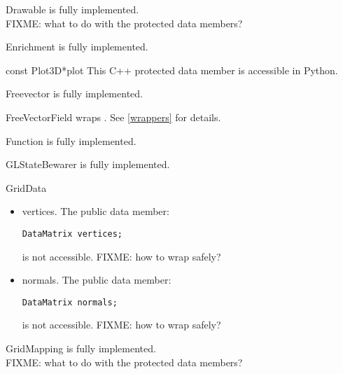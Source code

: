 \documentclass{manual}
\begin{document}
\begin{classdesc*}{Drawable}
  is fully implemented.\\
  FIXME: what to do with the protected data members?
\end{classdesc*}

\begin{classdesc*}{Enrichment}
  is fully implemented.\\
  \begin{cvardesc}{const Plot3D*}{plot}
    This C++ protected data member is accessible in Python.
  \end{cvardesc}
\end{classdesc*}

\begin{classdesc*}{Freevector}
  is fully implemented.
\end{classdesc*}

\begin{classdesc*}{FreeVectorField}
  wraps . See \ref{wrappers} for details.
\end{classdesc*}

\begin{classdesc*}{Function}
  is fully implemented.
\end{classdesc*}

\begin{classdesc*}{GLStateBewarer}
  is fully implemented.
\end{classdesc*}

\begin{classdesc*}{GridData}
  \begin{itemize}
  \item{vertices}. The public data member:
\begin{verbatim}
DataMatrix vertices;
\end{verbatim}
    is not accessible. FIXME: how to wrap  safely?
  \item{normals}. The public data member:
\begin{verbatim}
DataMatrix normals;
\end{verbatim}
    is not accessible. FIXME: how to wrap  safely?
  \end{itemize}
\end{classdesc*}

\begin{classdesc*}{GridMapping}
  is fully implemented.\\
  FIXME: what to do with the protected data members?
\end{classdesc*}
\end{document}
